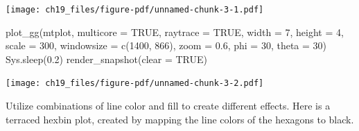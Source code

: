 \documentclass[
  letterpaper,
  DIV=11,
  numbers=noendperiod]{scrreprt}
\newenvironment{Shaded}{\begin{snugshade}}{\end{snugshade}}
\newcommand{\AttributeTok}[1]{\textcolor[rgb]{0.40,0.45,0.13}{#1}}
\newcommand{\ConstantTok}[1]{\textcolor[rgb]{0.56,0.35,0.01}{#1}}
\newcommand{\DecValTok}[1]{\textcolor[rgb]{0.68,0.00,0.00}{#1}}
\newcommand{\FloatTok}[1]{\textcolor[rgb]{0.68,0.00,0.00}{#1}}
\newcommand{\FunctionTok}[1]{\textcolor[rgb]{0.28,0.35,0.67}{#1}}
\newcommand{\NormalTok}[1]{\textcolor[rgb]{0.00,0.23,0.31}{#1}}
\begin{document}
\texttt{[image: ch19\_files/figure-pdf/unnamed-chunk-3-1.pdf]}

\begin{Shaded}
\begin{Highlighting}[]
\FunctionTok{plot\_gg}\NormalTok{(mtplot, }\AttributeTok{multicore =} \ConstantTok{TRUE}\NormalTok{, }\AttributeTok{raytrace =} \ConstantTok{TRUE}\NormalTok{, }\AttributeTok{width =} \DecValTok{7}\NormalTok{, }\AttributeTok{height =} \DecValTok{4}\NormalTok{, }
        \AttributeTok{scale =} \DecValTok{300}\NormalTok{, }\AttributeTok{windowsize =} \FunctionTok{c}\NormalTok{(}\DecValTok{1400}\NormalTok{, }\DecValTok{866}\NormalTok{), }\AttributeTok{zoom =} \FloatTok{0.6}\NormalTok{, }\AttributeTok{phi =} \DecValTok{30}\NormalTok{, }\AttributeTok{theta =} \DecValTok{30}\NormalTok{)}
\FunctionTok{Sys.sleep}\NormalTok{(}\FloatTok{0.2}\NormalTok{)}
\FunctionTok{render\_snapshot}\NormalTok{(}\AttributeTok{clear =} \ConstantTok{TRUE}\NormalTok{)}
\end{Highlighting}
\end{Shaded}

\texttt{[image: ch19\_files/figure-pdf/unnamed-chunk-3-2.pdf]}

Utilize combinations of line color and fill to create different effects.
Here is a terraced hexbin plot, created by mapping the line colors of
the hexagons to black.
\end{document}
